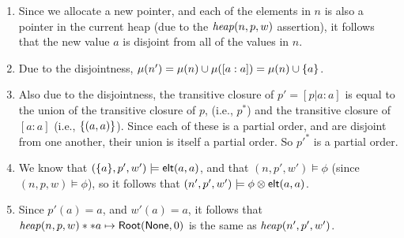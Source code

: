 \begin{enumerate}
\item Since we allocate a new pointer, and each of the elements in $n$ is also a pointer in the current heap (due to the $\mathit{heap}(n,p,w)$ assertion), it follows that the new value $a$ is disjoint from all of the values in $n$. 

\item Due to the disjointness, $\mu(n') = \mu(n) \cup \mu([a:a]) = \mu(n) \cup \{{a}\}$.

\item Also due to the disjointness, the transitive closure of $p' = [p|a:a]$ is equal to the union of the transitive closure of $p$, (i.e., $p^{*}$) and the transitive closure of $[a:a]$ (i.e., $\{{(a,a)}\}$). Since each of these is a partial order, and are disjoint from one another, their union is itself a partial order. So $p'^{*}$ is a partial order. 

\item We know that $(\{{a}\}, p', w') \models \mathsf{elt}({a}, {a})$, and that 
$(n, p', w') \models \phi$ (since $(n, p, w) \models \phi$), so it follows
that $(n', p', w') \models \phi \otimes \mathsf{elt}({a}, {a})$. 

\item Since $p'(a) = a$, and $w'(a) = a$, it follows that $\mathit{heap}(n, p, w) * 
* a \mapsto \mathsf{Root}(\mathsf{None}, 0)$ is the same as $\mathit{heap}(n', p', w')$. 
\end{enumerate}

